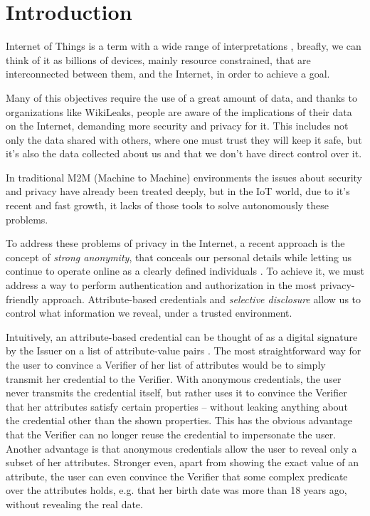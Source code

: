 
\section{Introduction}

Internet of Things is a term with a wide range of interpretations \cite{Atzori20102787}, breafly, we can think of it as billions of devices, mainly resource constrained, that are interconnected between them, and the Internet, in order to achieve a goal.

Many of this objectives require the use of a great amount of data, and thanks to organizations like WikiLeaks, people are aware of the implications of their data on the Internet, demanding more security and privacy for it. This includes not only the data shared with others, where one must trust they will keep it safe, but it's also the data collected about us and that we don't have direct control over it.

In traditional M2M (Machine to Machine) environments the issues about security and privacy have already been treated deeply, but in the IoT world, due to it's recent and fast growth, it lacks of those tools to solve autonomously these problems.

To address these problems of privacy in the Internet, a recent approach is the concept of \textit{strong anonymity}, that conceals our personal details while letting us continue to operate online as a clearly defined individuals \cite{stronganonymity}. To achieve it, we must address a way to perform authentication and authorization in the most privacy-friendly approach. Attribute-based credentials and \textit{selective disclosure} allow us to control what information we reveal, under a trusted environment.

Intuitively, an attribute-based credential can be thought of as a digital signature by the Issuer on a list of attribute-value pairs \cite{introCredIBM}.
The most straightforward way for the user to convince a Verifier of her list of attributes would be to simply transmit her credential to the Verifier.
With anonymous credentials, the user never transmits the credential itself, but rather uses it to convince the Verifier that her attributes satisfy certain properties – without leaking anything about the credential other than the shown properties. This has the obvious advantage that the Verifier can no longer reuse the credential to impersonate the user. Another advantage is that anonymous credentials allow the user to reveal only a subset of her attributes.
Stronger even, apart from showing the exact value of an attribute, the user can even convince the
Verifier that some complex predicate over the attributes holds, e.g. that her birth date was more than 18 years ago, without revealing the real date.

